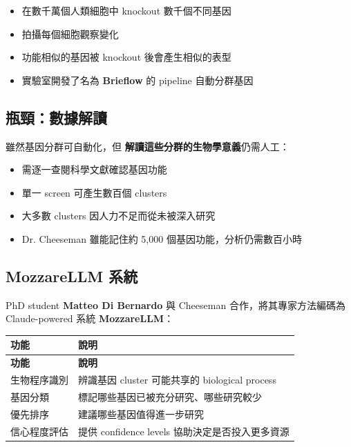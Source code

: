 \documentclass[12pt,a4paper]{article}
\begin{document}
\begin{itemize}
    \item 在數千萬個人類細胞中 knockout 數千個不同基因
    \item 拍攝每個細胞觀察變化
    \item 功能相似的基因被 knockout 後會產生相似的表型
    \item 實驗室開發了名為 \textbf{Brieflow} 的 pipeline 自動分群基因
\end{itemize}

\subsection{瓶頸：數據解讀}

雖然基因分群可自動化，但 \textbf{解讀這些分群的生物學意義}仍需人工：

\begin{itemize}
    \item 需逐一查閱科學文獻確認基因功能
    \item 單一 screen 可產生數百個 clusters
    \item 大多數 clusters 因人力不足而從未被深入研究
    \item Dr. Cheeseman 雖能記住約 5,000 個基因功能，分析仍需數百小時
\end{itemize}

\subsection{MozzareLLM 系統}

PhD student \textbf{Matteo Di Bernardo} 與 Cheeseman 合作，將其專家方法編碼為 Claude-powered 系統 \textbf{MozzareLLM}：

\begin{longtable}{p{4cm}p{10cm}}
\toprule
\textbf{功能} & \textbf{說明} \\
\midrule
\endfirsthead

\toprule
\textbf{功能} & \textbf{說明} \\
\midrule
\endhead

\bottomrule
\endfoot

生物程序識別 & 辨識基因 cluster 可能共享的 biological process \\
\midrule
基因分類 & 標記哪些基因已被充分研究、哪些研究較少 \\
\midrule
優先排序 & 建議哪些基因值得進一步研究 \\
\midrule
信心程度評估 & 提供 confidence levels 協助決定是否投入更多資源 \\
\bottomrule
\end{longtable}
\end{document}
